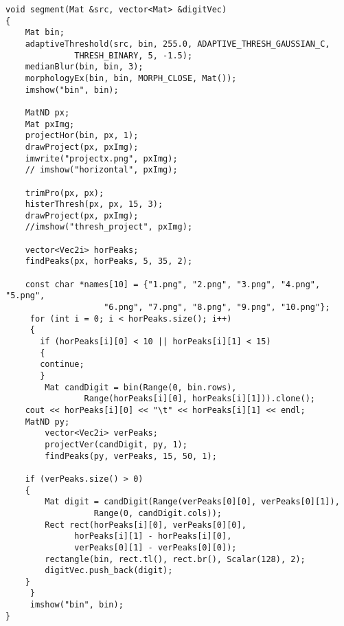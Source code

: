 \begin{lstlisting}
void segment(Mat &src, vector<Mat> &digitVec)
{
    Mat bin;
    adaptiveThreshold(src, bin, 255.0, ADAPTIVE_THRESH_GAUSSIAN_C,
		      THRESH_BINARY, 5, -1.5);
    medianBlur(bin, bin, 3);
    morphologyEx(bin, bin, MORPH_CLOSE, Mat());
    imshow("bin", bin);

    MatND px;
    Mat pxImg;
    projectHor(bin, px, 1);
    drawProject(px, pxImg);
    imwrite("projectx.png", pxImg);
    // imshow("horizontal", pxImg);

    trimPro(px, px);
    histerThresh(px, px, 15, 3);
    drawProject(px, pxImg);
    //imshow("thresh_project", pxImg);

    vector<Vec2i> horPeaks;
    findPeaks(px, horPeaks, 5, 35, 2);

    const char *names[10] = {"1.png", "2.png", "3.png", "4.png", "5.png",
     			    "6.png", "7.png", "8.png", "9.png", "10.png"};
     for (int i = 0; i < horPeaks.size(); i++)
     {
       if (horPeaks[i][0] < 10 || horPeaks[i][1] < 15)
       {
	   continue;
       }
      	Mat candDigit = bin(Range(0, bin.rows),
      			Range(horPeaks[i][0], horPeaks[i][1])).clone();
	cout << horPeaks[i][0] << "\t" << horPeaks[i][1] << endl;
 	MatND py;
     	vector<Vec2i> verPeaks;
     	projectVer(candDigit, py, 1);
     	findPeaks(py, verPeaks, 15, 50, 1);

	if (verPeaks.size() > 0)
	{
	    Mat digit = candDigit(Range(verPeaks[0][0], verPeaks[0][1]),
				  Range(0, candDigit.cols));
	    Rect rect(horPeaks[i][0], verPeaks[0][0], 
		      horPeaks[i][1] - horPeaks[i][0],
		      verPeaks[0][1] - verPeaks[0][0]);
	    rectangle(bin, rect.tl(), rect.br(), Scalar(128), 2);
	    digitVec.push_back(digit);
	}
     }
     imshow("bin", bin);
}
\end{lstlisting}


